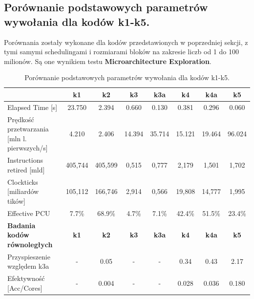\documentclass[10pt]{article}
\begin{document}
\subsection*{Porównanie podstawowych parametrów wywołania dla kodów k1-k5.}
Porównania zostały wykonane dla kodów przedstawionych w poprzedniej sekcji, z tymi samymi schedulingami
i rozmiarami bloków na zakresie liczb od 1 do 100 milionów. Są one wynikiem testu \textbf{Microarchitecture Exploration}.
\begin{table}[h!]
\centering
\begingroup
\begin{tabular}{|l|c|c|c|c|c|c|c|}
\hline
 & \textbf{k1} & \textbf{k2} & \textbf{k3} & \textbf{k3a} & \textbf{k4} & \textbf{k4a} & \textbf{k5} \\
\hline
Elapsed Time [s] & 23.750 & 2.394 & 0.660 & 0.130 & 0.381 & 0.296 & 0.060 \\
\hline
Prędkość przetwarzania [mln l. pierwszych/s] & 4.210 & 2.406 & 14.394 & 35.714 & 15.121 & 19.464 & 96.024 \\
\hline
Instructions retired [mld] & 405,744 & 405,599 & 0,515 & 0,777 & 2,179 & 1,501 & 1,702 \\
\hline
Clockticks [miliardów tików] & 105,112 & 166,746 & 2,914 & 0,566 & 19,808 & 14,777 & 1,995 \\
\hline
Effective PCU & 7.7\% & 68.9\% & 4.7\% & 7.1\% & 42.4\% & 51.5\% & 23.4\% \\
\hline
\textbf{Badania kodów równoległych} & \textbf{k1} & \textbf{k2} & \textbf{k3} & \textbf{k3a} & \textbf{k4} & \textbf{k4a} & \textbf{k5} \\
\hline
Przyspieszenie względem k3a & - & 0.05 & - & - & 0.34 & 0.43 & 2.17 \\
\hline
Efektywność [Acc/Cores] & - & 0.004 & - & - & 0.028 & 0.036 & 0.180 \\
\hline
\end{tabular}%
\endgroup
\caption{Porównanie podstawowych parametrów wywołania dla kodów k1-k5.}
\end{table}
\end{document}
